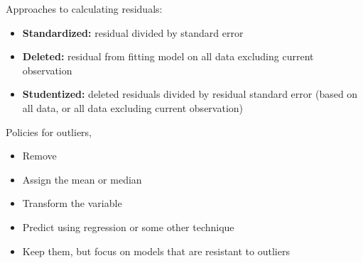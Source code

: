\documentclass{article}
\theoremstyle{mytheoremstyle}
\theoremstyle{mytheoremstyle}
\theoremstyle{myproblemstyle}
\begin{document}
    \noindent Approaches to calculating residuals:
    \begin{itemize}
    	\item \textbf{Standardized: } residual divided by standard error
	\item \textbf{Deleted: } residual from fitting model on all data
		excluding current observation
	\item \textbf{Studentized: } deleted residuals divided by residual
		standard error (based on all data, or all data excluding
		    current observation)
    \end{itemize}

    \pagebreak

    \noindent Policies for outliers,
    \begin{itemize}
    	\item Remove
	\item Assign the mean or median
	\item Transform the variable
	\item Predict using regression or some other technique
	\item Keep them, but focus on models that are resistant
		to outliers
    \end{itemize}
    
\end{document}
